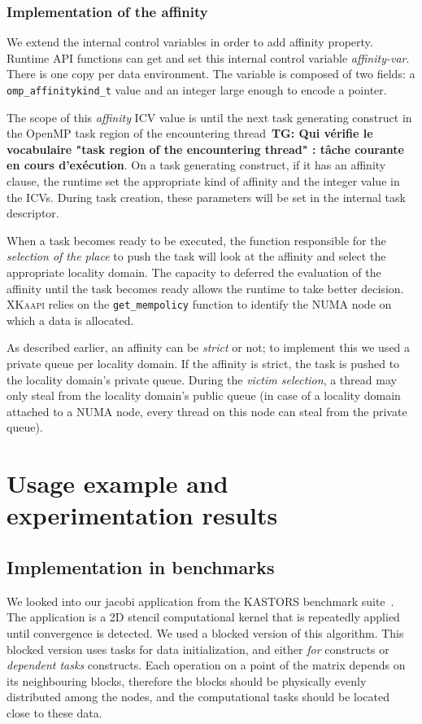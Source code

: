 \documentclass{Styles/llncs}
\newcommand{\kaapi}{\textsc{\mbox{XKaapi}}\xspace}
\newcommand{\TG}[1]{{\color{red}\bfseries TG: #1}}
\begin{document}
\subsubsection{Implementation of the affinity}
We extend the internal control variables in order to add affinity property. Runtime API functions can get and set this internal control variable \textit{affinity-var}. There is one copy per data environment. The variable is composed of two fields: a \texttt{omp\_affinitykind\_t} value and an integer large enough to encode a pointer.

The scope of this \textit{affinity} ICV value is until the next task generating construct in the OpenMP task region of the encountering thread~\cite{openmp40}\TG{Qui vérifie le vocabulaire "task region of the encountering thread" : tâche courante en cours d'exécution}. 
On a task generating construct, if it has an affinity clause, the runtime set the appropriate kind of affinity and the integer value in the ICVs.
During task creation, these parameters will be set in the internal task descriptor.

When a task becomes ready to be executed, the function responsible for the \textit{selection of the place} to push
the task will look at the affinity and select the appropriate locality domain. The capacity to deferred the evaluation of the affinity until the task becomes ready allows the runtime to take better decision.
\kaapi relies on the \verb/get_mempolicy/ function to identify the NUMA node on which a data is allocated.

As described earlier, an affinity can be \emph{strict} or not; to implement this we used
a private queue per locality domain. If the affinity is strict, the task is pushed to the locality domain's private queue.
During the \textit{victim selection}, a thread may only steal from the locality domain's
public queue (in case of a locality domain attached to a NUMA node, every thread on this node can steal from the private queue).

\section{Usage example and experimentation results}

\subsection{Implementation in benchmarks}

We looked into our jacobi application from the KASTORS benchmark suite~\cite{virouleau:hal-01081974}.
The application is a 2D stencil computational kernel that is repeatedly applied until
convergence is detected. We used a blocked version of this algorithm.
This blocked version uses tasks for data initialization, and either \emph{for} constructs or
\emph{dependent tasks} constructs.
Each operation on a point of the matrix depends on its neighbouring blocks,
therefore the blocks should be physically evenly distributed among the nodes,
and the computational tasks should be located close to these data.
\end{document}
